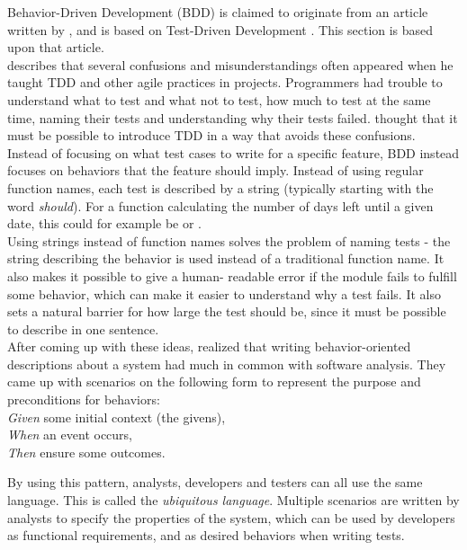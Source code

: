Behavior-Driven Development (BDD) is claimed to originate from an
article written by \citet{web:dan_north}, and is based on Test-Driven
Development \cite{wiki:bdd}. This section is based upon that article.\\

\citeauthor{web:dan_north} describes that several confusions and
misunderstandings often appeared when he taught TDD and other agile
practices in projects. Programmers had trouble to understand what to
test and what not to test, how much to test at the same time, naming
their tests and understanding why their tests failed.
\citeauthor{web:dan_north} thought that it must be possible to introduce
TDD in a way that avoids these confusions.\\

Instead of focusing on what test cases to write for a specific feature,
BDD instead focuses on behaviors that the feature should imply. Instead
of using regular function names, each test is described by a string
(typically starting with the word \emph{should}). For a function
calculating the number of days left until a given date, this could for
example be  or
.\\

Using strings instead of function names solves the problem of naming
tests - the string describing the behavior is used instead of a
traditional function name. It also makes it possible to give a human-
readable error if the module fails to fulfill some behavior, which can
make it easier to understand why a test fails. It also sets a natural
barrier for how large the test should be, since it must be possible to
describe in one sentence.\\

After coming up with these ideas, \citeauthor{web:dan_north} realized
that writing behavior-oriented descriptions about a system had much in
common with software analysis. They came up with scenarios on the
following form to represent the purpose and preconditions for
behaviors:\\

\emph{Given} some initial context (the givens),\\
\emph{When} an event occurs,\\
\emph{Then} ensure some outcomes.

By using this pattern, analysts, developers and testers can all use the
same language. This is called the \emph{ubiquitous language}. Multiple
scenarios are written by analysts to specify the properties of the
system, which can be used by developers as functional requirements, and
as desired behaviors when writing tests.\\
